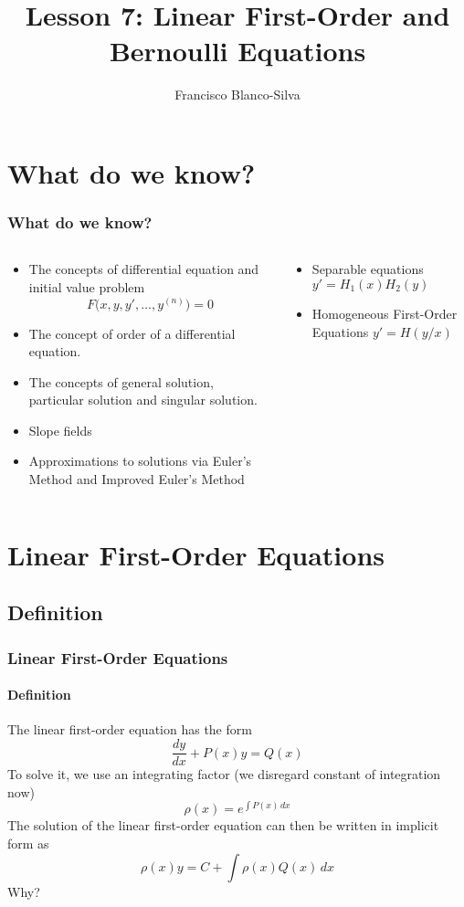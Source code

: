 \documentclass[smaller,xcolor=x11names,compress]{beamer}
\author[Francisco Blanco-Silva]{Francisco Blanco-Silva}
\institute[USC]{University of South Carolina}
\date{
	\begin{tikzpicture}[decoration=Koch curve type 2] 
		\draw[DeepSkyBlue4] decorate{ decorate{ decorate{ (0,0) -- (3,0) }}}; 
	\end{tikzpicture}  
	\\
	\today
}
\title{Lesson 7: Linear First-Order and Bernoulli Equations}
\begin{document}
\frame{\titlepage}

\section{What do we know?}
\begin{frame}\frametitle{What do we know?}
\begin{columns}[T]
\begin{column}{0.6\linewidth}
\begin{itemize}
\item The concepts of \alert{differential equation} and \alert{initial value problem}
\begin{equation*}
F\big(x,y,y',\dotsc,y^{(n)}\big)=0
\end{equation*}
\item The concept of \alert{order} of a differential equation.
\item The concepts of \alert{general solution}, \alert{particular solution} and \alert{singular solution}.
\item \alert{Slope fields}
\item Approximations to solutions via \alert{Euler's Method} and \alert{Improved Euler's Method}
\end{itemize} 
\end{column}
\begin{column}{0.4\linewidth}
\begin{itemize}
\item Separable equations $y'=H_1(x) H_2(y)$
\item Homogeneous First-Order Equations $y'=H(y/x)$
\end{itemize}
\end{column}
\end{columns}
\end{frame}

\section{Linear First-Order Equations}
\subsection{Definition}
\begin{frame}\frametitle{Linear First-Order Equations}
\framesubtitle{Definition}
The linear first-order equation has the form
\begin{equation*}
	\frac{dy}{dx}+P(x)y=Q(x)	
\end{equation*}
\pause To solve it, we use an integrating factor (we disregard constant of integration now)
\begin{equation*}
\rho(x) = e^{\int P(x)\, dx} 
\end{equation*}
\pause The solution of the linear first-order equation can then be written in implicit form as
\begin{equation*}
\rho(x) y = C+ \int \rho(x) Q(x)\, dx
\end{equation*}
\pause \alert{Why?}
\end{frame}
\end{document}
